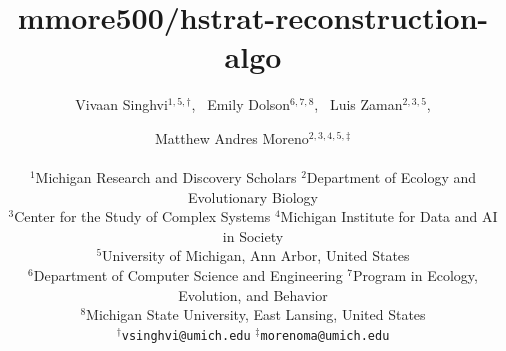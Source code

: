 \title{mmore500/hstrat-reconstruction-algo}

\author{
    Vivaan Singhvi$^{1,5,\dagger}$,\ %
    Emily Dolson$^{6,7,8}$,\ %
    Luis Zaman$^{2,3,5}$, \and
    Matthew Andres Moreno$^{2,3,4,5,\ddagger}$ \\
    \mbox{}\\
    $^1$Michigan Research and Discovery Scholars
    $^2$Department of Ecology and Evolutionary Biology \\
    $^3$Center for the Study of Complex Systems
    $^4$Michigan Institute for Data and AI in Society \\
    $^5$University of Michigan, Ann Arbor, United States \\
    $^6$Department of Computer Science and Engineering
    $^7$Program in Ecology, Evolution, and Behavior \\
    $^8$Michigan State University, East Lansing, United States \\
    $^\dagger$\texttt{vsinghvi@umich.edu} $^\ddagger$\texttt{morenoma@umich.edu}
}

\maketitle


\maketitle
